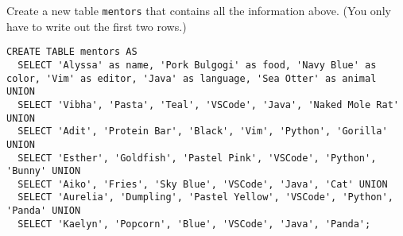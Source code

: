 \question Create a new table \lstinline$mentors$ that contains all the information above.
(You only have to write out the first two rows.)

\begin{solution}[3in]
\begin{lstlisting}
CREATE TABLE mentors AS
  SELECT 'Alyssa' as name, 'Pork Bulgogi' as food, 'Navy Blue' as color, 'Vim' as editor, 'Java' as language, 'Sea Otter' as animal UNION
  SELECT 'Vibha', 'Pasta', 'Teal', 'VSCode', 'Java', 'Naked Mole Rat' UNION
  SELECT 'Adit', 'Protein Bar', 'Black', 'Vim', 'Python', 'Gorilla' UNION
  SELECT 'Esther', 'Goldfish', 'Pastel Pink', 'VSCode', 'Python', 'Bunny' UNION
  SELECT 'Aiko', 'Fries', 'Sky Blue', 'VSCode', 'Java', 'Cat' UNION
  SELECT 'Aurelia', 'Dumpling', 'Pastel Yellow', 'VSCode', 'Python', 'Panda' UNION
  SELECT 'Kaelyn', 'Popcorn', 'Blue', 'VSCode', 'Java', 'Panda';
\end{lstlisting}
\end{solution}
